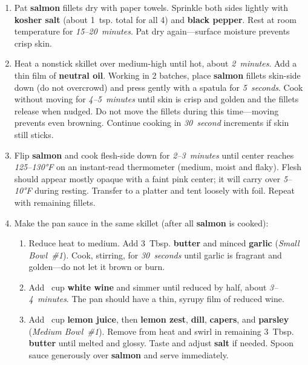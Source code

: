 \documentclass[11pt,letterpaper]{article}
\begin{document}
\begin{enumerate}
    \item Pat \textbf{salmon} fillets dry with paper towels. Sprinkle both sides lightly with \textbf{kosher salt} (about 1~tsp. total for all 4) and \textbf{black pepper}. Rest at room temperature for \textit{15--20~minutes}. Pat dry again---surface moisture prevents crisp skin.

    \item Heat a nonstick skillet over medium-high until hot, about \textit{2~minutes}. Add a thin film of \textbf{neutral oil}. Working in 2 batches, place \textbf{salmon} fillets skin-side down (do not overcrowd) and press gently with a spatula for \textit{5~seconds}. Cook without moving for \textit{4--5~minutes} until skin is crisp and golden and the fillets release when nudged. Do not move the fillets during this time---moving prevents even browning. Continue cooking in \textit{30~second} increments if skin still sticks.

    \item Flip \textbf{salmon} and cook flesh-side down for \textit{2--3~minutes} until center reaches \textit{125--130°F} on an instant-read thermometer (medium, moist and flaky). Flesh should appear mostly opaque with a faint pink center; it will carry over \textit{5--10°F} during resting. Transfer to a platter and tent loosely with foil. Repeat with remaining fillets.

    \item Make the pan sauce in the same skillet (after all \textbf{salmon} is cooked):
\begin{enumerate}
    \item Reduce heat to medium. Add 3~Tbsp. \textbf{butter} and minced \textbf{garlic} (\textit{Small Bowl~\#1}). Cook, stirring, for \textit{30~seconds} until garlic is fragrant and golden---do not let it brown or burn.
    \item Add ~cup \textbf{white wine} and simmer until reduced by half, about \textit{3--4~minutes}. The pan should have a thin, syrupy film of reduced wine.
    \item Add ~cup \textbf{lemon juice}, then \textbf{lemon zest}, \textbf{dill}, \textbf{capers}, and \textbf{parsley} (\textit{Medium Bowl~\#1}). Remove from heat and swirl in remaining 3~Tbsp. \textbf{butter} until melted and glossy. Taste and adjust \textbf{salt} if needed. Spoon sauce generously over \textbf{salmon} and serve immediately.
\end{enumerate}
\end{enumerate}
\end{document}
